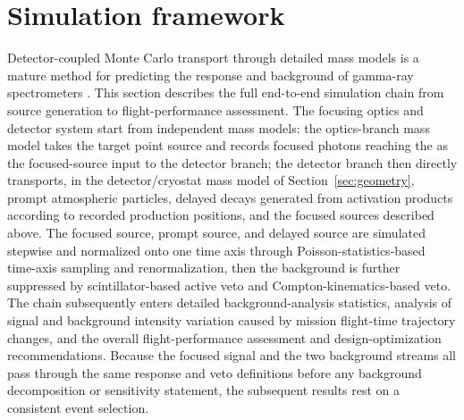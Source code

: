 \documentclass[11pt]{article}
\begin{document}
\FloatBarrier

\section{Simulation framework}
\label{sec:framework}

Detector-coupled Monte Carlo transport through detailed mass models is a mature method for predicting the response and background of gamma-ray spectrometers \cite{Sturner2003}. This section describes the full end-to-end simulation chain from source generation to flight-performance assessment. The focusing optics and detector system start from independent mass models: the optics-branch mass model takes the target point source and records focused photons reaching the  as the focused-source input to the detector branch; the detector branch then directly transports, in the detector/cryostat mass model of Section~\ref{sec:geometry}, prompt atmospheric particles, delayed decays generated from activation products according to recorded production positions, and the focused sources described above. The focused source, prompt source, and delayed source are simulated stepwise and normalized onto one time axis through Poisson-statistics-based time-axis sampling and renormalization, then the background is further suppressed by scintillator-based active veto and Compton-kinematics-based veto. The chain subsequently enters detailed background-analysis statistics, analysis of signal and background intensity variation caused by mission flight-time trajectory changes, and the overall flight-performance assessment and design-optimization recommendations. Because the focused signal and the two background streams all pass through the same response and veto definitions before any background decomposition or sensitivity statement, the subsequent results rest on a consistent event selection.
\end{document}
